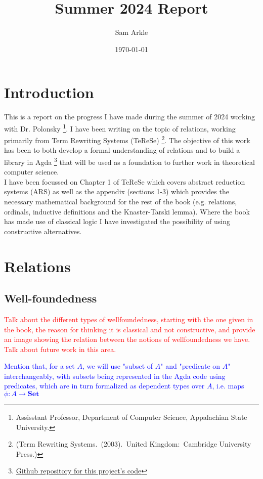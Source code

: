 \documentclass{scrartcl}
\title{Summer 2024 Report}
\author{Sam Arkle}
\date{\today}
\newcommand{\bset}{\mathbf{Set}}
\newcommand{\sacomment}[1]{\textcolor{red}{#1}}
\newcommand{\apcomment}[1]{\textcolor{blue}{#1}}
\begin{document}
\maketitle

\section{Introduction}
This is a report on the progress I have made during the summer of 2024 working with Dr. Polonsky \footnote{Assisstant Professor, Department of Computer Science, Appalachian State University.}. I have been writing on the topic of relations, working primarily from Term Rewriting Systems (TeReSe) \footnote{(Term Rewriting Systems. (2003). United Kingdom: Cambridge University Press.)}.
The objective of this work has been to both develop a formal understanding of relations and to build a library in Agda \footnote{\href{https://github.com/DrPolonsky/LAM/tree/main/Relations}{Github repository for this project's code}} that will be used as a foundation to further work in theoretical computer science.
\\
I have been focussed on Chapter 1 of TeReSe which covers abstract reduction systems (ARS) as well as the appendix (sections 1-3) which provides the necessary mathematical background for the rest of the book (e.g. relations, ordinals, inductive definitions and the Knaster-Tarski lemma). Where the book has made use of classical logic I have investigated the possibility of using constructive alternatives.

\section{Relations}

\subsection{Well-foundedness}
\sacomment{Talk about the different types of wellfoundedness, starting with the one given in the book, the reason for thinking it is classical and not constructive, and provide an image showing the relation between the notions of wellfoundedness we have. Talk about future work in this area.}

\apcomment{Mention that, for a set $A$, we will use "subset of $A$" and "predicate on $A$" interchangeably,
with subsets being represented in the Agda code using predicates, which are in turn formalized as
dependent types over $A$, i.e. maps $\phi : A \to \bset$ }
\end{document}
